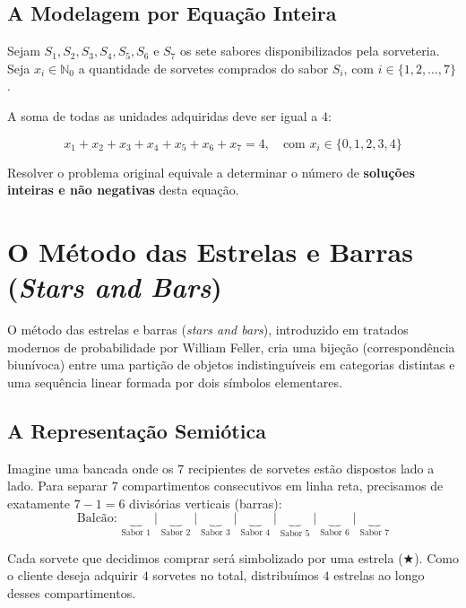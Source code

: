 \documentclass[12pt,a4paper]{report}
\begin{document}
	\section{A Modelagem por Equação Inteira}
	\label{sec:equacao}
	
	Sejam $S_1, S_2, S_3, S_4, S_5, S_6$ e $S_7$ os sete sabores disponibilizados pela sorveteria. Seja $x_i \in \mathbb{N}_0$ a quantidade de sorvetes comprados do sabor $S_i$, com $i \in \{1, 2, \dots, 7\}$.
	
	A soma de todas as unidades adquiridas deve ser igual a $4$:
	
	\begin{destaque}
		\label{dest:eq_modelo}
		$$x_1 + x_2 + x_3 + x_4 + x_5 + x_6 + x_7 = 4, \quad \text{com } x_i \in \{0, 1, 2, 3, 4\}$$
	\end{destaque}
	
	Resolver o problema original equivale a determinar o número de \textbf{soluções inteiras e não negativas} desta equação.
	
	\chapter{O Método das Estrelas e Barras (\textit{Stars and Bars})}
	\label{cap:metodo}
	
	O método das estrelas e barras (\textit{stars and bars}), introduzido em tratados modernos de probabilidade por William Feller, cria uma bijeção (correspondência biunívoca) entre uma partição de objetos indistinguíveis em categorias distintas e uma sequência linear formada por dois símbolos elementares.
	
	\section{A Representação Semiótica}
	
	Imagine uma bancada onde os $7$ recipientes de sorvetes estão dispostos lado a lado. Para separar $7$ compartimentos consecutivos em linha reta, precisamos de exatamente $7 - 1 = 6$ divisórias verticais (barras):
	$$\text{Balcão: } \underbrace{\quad}_{\text{Sabor 1}} \mid \underbrace{\quad}_{\text{Sabor 2}} \mid \underbrace{\quad}_{\text{Sabor 3}} \mid \underbrace{\quad}_{\text{Sabor 4}} \mid \underbrace{\quad}_{\text{Sabor 5}} \mid \underbrace{\quad}_{\text{Sabor 6}} \mid \underbrace{\quad}_{\text{Sabor 7}}$$
	
	Cada sorvete que decidimos comprar será simbolizado por uma estrela ($\bigstar$). Como o cliente deseja adquirir $4$ sorvetes no total, distribuímos $4$ estrelas ao longo desses compartimentos.
	
\end{document}
